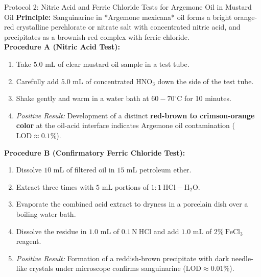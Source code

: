 \documentclass[11pt,a4paper,oneside]{article}
\begin{document}
\begin{protocolbox}{Protocol 2: Nitric Acid and Ferric Chloride Tests for Argemone Oil in Mustard Oil}
\textbf{Principle:} Sanguinarine in *Argemone mexicana* oil forms a bright orange-red crystalline perchlorate or nitrate salt with concentrated nitric acid, and precipitates as a brownish-red complex with ferric chloride.\\
\textbf{Procedure A (Nitric Acid Test):}
\begin{enumerate}
    \item Take $5.0\text{ mL}$ of clear mustard oil sample in a test tube.
    \item Carefully add $5.0\text{ mL}$ of concentrated $\mathrm{HNO_3}$ down the side of the test tube.
    \item Shake gently and warm in a water bath at $60-70^\circ\text{C}$ for 10 minutes.
    \item \textit{Positive Result:} Development of a distinct \textbf{red-brown to crimson-orange color} at the oil-acid interface indicates Argemone oil contamination ($\text{LOD} \approx 0.1\%$).
\end{enumerate}
\textbf{Procedure B (Confirmatory Ferric Chloride Test):}
\begin{enumerate}
    \item Dissolve $10\text{ mL}$ of filtered oil in $15\text{ mL}$ petroleum ether.
    \item Extract three times with $5\text{ mL}$ portions of $1:1\ \mathrm{HCl}-\mathrm{H_2O}$.
    \item Evaporate the combined acid extract to dryness in a porcelain dish over a boiling water bath.
    \item Dissolve the residue in $1.0\text{ mL}$ of $0.1\,\mathrm{N}\ \mathrm{HCl}$ and add $1.0\text{ mL}$ of $2\%\ \mathrm{FeCl_3}$ reagent.
    \item \textit{Positive Result:} Formation of a reddish-brown precipitate with dark needle-like crystals under microscope confirms sanguinarine ($\text{LOD} \approx 0.01\%$).
\end{enumerate}
\end{protocolbox}
\end{document}

